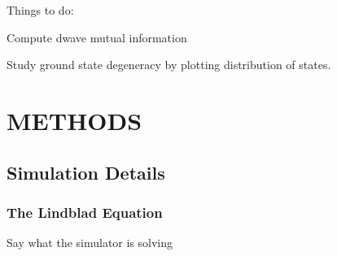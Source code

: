 \documentclass[prd,twocolumn,tightenlines,preprintnumbers,showpacs,superscriptaddress,notitlepage,nofootinbib,eqsecnum,floatfix,longbibliography]{revtex4}
\begin{document}
Things to do:

Compute dwave mutual information

Study ground state degeneracy by plotting distribution of states.

\section{METHODS}
\subsection{Simulation Details}
\subsubsection{The Lindblad Equation}
\label{sec:methods:lindblad}
Say what the simulator is solving
\end{document}
